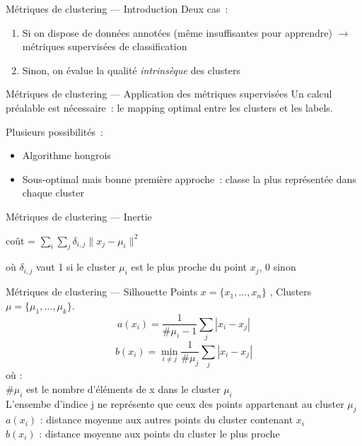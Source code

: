 \begin{frame}{Métriques de clustering --- Introduction}
  Deux cas~:

  \begin{enumerate}[<+->]
    \item Si on dispose de données annotées (même insuffisantes pour apprendre) $\rightarrow$ métriques supervisées de classification
    \item Sinon, on évalue la qualité \emph{intrinsèque} des clusters
  \end{enumerate}

\end{frame}

\begin{frame}{Métriques de clustering --- Application des métriques supervisées}
  Un calcul préalable est nécessaire~: le mapping optimal entre les clusters et les labels.

  Plusieurs possibilités~:

  \begin{itemize}[<+->]
    \item Algorithme hongrois
    \item Sous-optimal mais bonne première approche~: classe la plus représentée dans chaque cluster
  \end{itemize}
\end{frame}

\begin{frame}{Métriques de clustering --- Inertie}
  \begin{center}
    coût = $\sum_i \sum_j \delta_{i,j}\lVert x_j - \mu_i \rVert^2$
  \end{center}
  où $\delta_{i,j}$ vaut 1 si le cluster $\mu_i$ est le plus proche du point $x_j$, 0 sinon
\end{frame}

\begin{frame}{Métriques de clustering --- Silhouette}
  Points $x = \{x_1, \dotsc, x_n\}$ , Clusters $\mu = \{\mu_1, \dotsc, \mu_k\}$. \\
  \[
  \boxed{a(x_i) = \frac{1}{\#\mu_i-1}\sum_j |x_i - x_j|}
  \]
  \[
  \boxed{b(x_i) = \min_{i \neq j} \frac{1}{\#\mu_j}\sum_j |x_i - x_j|}
  \]
  où : \\
  $\#\mu_i$ est le nombre d'éléments de x dans le cluster $\mu_i$ \\
  L'ensembe d'indice j ne représente que ceux des points appartenant au cluster $\mu_j$ \\
  $a(x_i)$ : distance moyenne aux autres points du cluster contenant $x_i$ \\
  $b(x_i)$ : distance moyenne aux points du cluster le plus proche
  
\end{frame}

